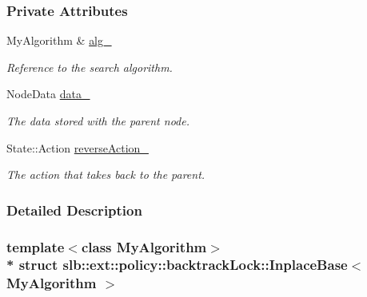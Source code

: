 \subsubsection*{Private Attributes}
\begin{DoxyCompactItemize}
\item 
My\+Algorithm \& \hyperlink{structslb_1_1ext_1_1policy_1_1backtrackLock_1_1InplaceBase_a24e865cfe03cd65824667f5a6d16a3b2}{alg\+\_\+}\hypertarget{structslb_1_1ext_1_1policy_1_1backtrackLock_1_1InplaceBase_a24e865cfe03cd65824667f5a6d16a3b2}{}\label{structslb_1_1ext_1_1policy_1_1backtrackLock_1_1InplaceBase_a24e865cfe03cd65824667f5a6d16a3b2}

\begin{DoxyCompactList}\small\item\em Reference to the search algorithm. \end{DoxyCompactList}\item 
Node\+Data \hyperlink{structslb_1_1ext_1_1policy_1_1backtrackLock_1_1InplaceBase_a984702ee6a149f5dd219ee3233c4567d}{data\+\_\+}\hypertarget{structslb_1_1ext_1_1policy_1_1backtrackLock_1_1InplaceBase_a984702ee6a149f5dd219ee3233c4567d}{}\label{structslb_1_1ext_1_1policy_1_1backtrackLock_1_1InplaceBase_a984702ee6a149f5dd219ee3233c4567d}

\begin{DoxyCompactList}\small\item\em The data stored with the parent node. \end{DoxyCompactList}\item 
State\+::\+Action \hyperlink{structslb_1_1ext_1_1policy_1_1backtrackLock_1_1InplaceBase_afcc45c39856522b24e6d23e3417eb0cb}{reverse\+Action\+\_\+}\hypertarget{structslb_1_1ext_1_1policy_1_1backtrackLock_1_1InplaceBase_afcc45c39856522b24e6d23e3417eb0cb}{}\label{structslb_1_1ext_1_1policy_1_1backtrackLock_1_1InplaceBase_afcc45c39856522b24e6d23e3417eb0cb}

\begin{DoxyCompactList}\small\item\em The action that takes back to the parent. \end{DoxyCompactList}\end{DoxyCompactItemize}


\subsubsection{Detailed Description}
\subsubsection*{template$<$class My\+Algorithm$>$\\*
struct slb\+::ext\+::policy\+::backtrack\+Lock\+::\+Inplace\+Base$<$ My\+Algorithm $>$}

